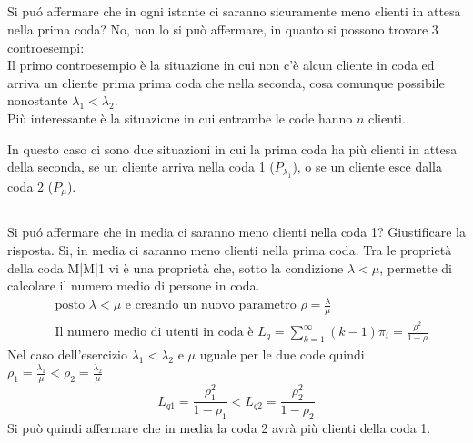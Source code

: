 \documentclass[a4paper]{article}
\begin{document}
\subsection{}
Si puó affermare che in ogni istante ci saranno sicuramente meno clienti in attesa nella prima coda?
No, non lo si può affermare, in quanto si possono trovare 3 controesempi:\\
Il primo controesempio è la situazione in cui non c'è alcun cliente in coda ed arriva un cliente prima prima coda che nella seconda, cosa comunque possibile nonostante $\lambda_1 < \lambda_2$.\\
Più interessante è la situazione in cui entrambe le code hanno $n$ clienti. 
\begin{center}\end{center}
In questo caso ci sono due situazioni in cui la prima coda ha più clienti in attesa della seconda, se un cliente arriva nella coda 1 ($P_{\lambda_1}$), o se un cliente esce dalla coda 2 ($P_\mu$).
\subsection{}
Si puó affermare che in media ci saranno meno clienti nella coda 1? Giustificare la risposta.
Si, in media ci saranno meno clienti nella prima coda. Tra le proprietà della coda M|M|1 vi è una proprietà che, sotto la condizione $\lambda < \mu$, permette di calcolare il numero medio di persone in coda.
\begin{align*}
	&\text{posto } \lambda < \mu \text{ e creando un nuovo parametro } \rho = \frac{\lambda}{\mu} \\
	&\text{Il numero medio di utenti in coda è } L_{q}=\sum_{k=1}^{\infty}{(k-1)\pi_{i}}=\frac{\rho^{2}}{1-\rho}
\end{align*}
Nel caso dell'esercizio $\lambda_1 < \lambda_2$ e $\mu$ uguale per le due code quindi\\ $\rho_1 = \frac{\lambda_1}{\mu} < \rho_2 = \frac{\lambda_2}{\mu}$
$$L_{q1} = \frac{\rho_1^{2}}{1-\rho_1} < L_{q2} = \frac{\rho_2^{2}}{1-\rho_2}$$
Si può quindi affermare che in media la coda 2 avrà più clienti della coda 1.
\end{document}
